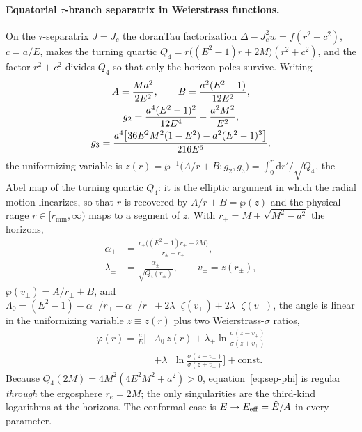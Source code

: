 \documentclass[12pt]{iopart}
\theoremstyle{plain}
\theoremstyle{definition}
\theoremstyle{remark}
\newcommand{\Ehat}{\hat E}
\newcommand{\re}{r_{e}}
\newcommand{\Jc}{J_{c}}
\newcommand{\dd}{\mathrm{d}}
\begin{document}
\paragraph{Equatorial $\tau$-branch separatrix in Weierstrass functions.} On the
$\tau$-separatrix $J=\Jc$ the doranTau factorization $\Delta-\Jc^2 w=f(r^2+c^2)$,
$c=a/E$, makes the
turning quartic $Q_4=r\big((E^2-1)r+2M\big)(r^2+c^2)$, and the factor $r^2+c^2$
divides $Q_4$ so that only the horizon poles survive. Writing
\begin{gather}
    A=\frac{Ma^2}{2E^2},\qquad B=\frac{a^2(E^2-1)}{12E^2},\notag\\
    g_2=\frac{a^4(E^2-1)^2}{12E^4}-\frac{a^2M^2}{E^2},\notag\\
    g_3=\frac{a^4\big[36E^2M^2(1-E^2)-a^2(E^2-1)^3\big]}{216E^6},
    \label{eq:wp-invariants}
\end{gather}
the uniformizing variable is $z(r)=\wp^{-1}\!\big(A/r+B;g_2,g_3\big)
=\int_0^r\dd r'/\sqrt{Q_4}$, the Abel map of the turning quartic $Q_4$: it is the
elliptic argument in which the radial motion linearizes, so that $r$ is recovered
by $A/r+B=\wp(z)$ and the physical range $r\in[r_{\min},\infty)$ maps to a
segment of $z$. With $r_\pm=M\pm\sqrt{M^2-a^2}$ the horizons,
\begin{equation}
\begin{aligned}
    \alpha_\pm&=\frac{r_\pm\big((E^2-1)r_\pm+2M\big)}{r_\pm-r_\mp},\\
    \lambda_\pm&=\frac{\alpha_\pm}{\sqrt{Q_4(r_\pm)}},\qquad v_\pm=z(r_\pm),
\end{aligned}
\end{equation}
$\wp(v_\pm)=A/r_\pm+B$, and
$\Lambda_0=(E^2-1)-\alpha_+/r_+-\alpha_-/r_-+2\lambda_+\zeta(v_+)+2\lambda_-\zeta(v_-)$,
the angle is linear in the uniformizing variable $z\equiv z(r)$ plus two
Weierstrass-$\sigma$ ratios,
\begin{equation}
\begin{split}
    \varphi(r)=\frac{a}{E}\Big[&\Lambda_0\,z(r)
      +\lambda_+\ln\frac{\sigma(z-v_+)}{\sigma(z+v_+)}\\
      &+\lambda_-\ln\frac{\sigma(z-v_-)}{\sigma(z+v_-)}\Big]+\text{const}.
\end{split}
    \label{eq:sep-phi}
\end{equation}
Because $Q_4(2M)=4M^2(4E^2M^2+a^2)>0$, equation~\eqref{eq:sep-phi} is regular
\emph{through} the ergosphere $\re=2M$; the only singularities are the
third-kind logarithms at the horizons. The conformal case is
$E\to E_{\rm eff}=\Ehat/A$ in every parameter.
\end{document}
